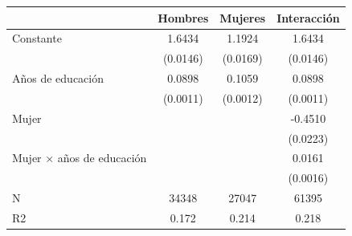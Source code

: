 \begin{table}
\centering
\begin{tabular}[t]{lccc}
\toprule
  & Hombres & Mujeres & Interacción\\
\midrule
Constante & 1.6434 & 1.1924 & 1.6434\\
 & (0.0146) & (0.0169) & (0.0146)\\
Años de educación & 0.0898 & 0.1059 & 0.0898\\
 & (0.0011) & (0.0012) & (0.0011)\\
Mujer &  &  & -0.4510\\
 &  &  & (0.0223)\\
Mujer × años de educación &  &  & 0.0161\\
 &  &  & (0.0016)\\
\midrule
N & 34348 & 27047 & 61395\\
R2 & 0.172 & 0.214 & 0.218\\
\bottomrule
\end{tabular}
\end{table}
